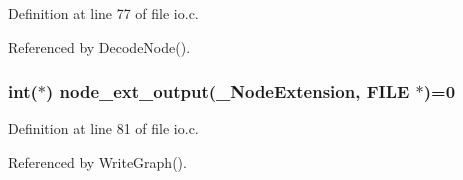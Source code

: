 Definition at line 77 of file io.c.

Referenced by Decode\-Node().
\subsubsection{\setlength{\rightskip}{0pt plus 5cm}int($\ast$) \bf{node\_\-ext\_\-output}(\bf{\_\-Node\-Extension}, FILE $\ast$)=0}\label{io_8c_33ec8f1a5bc2744549a1bfc005cd7d26}




Definition at line 81 of file io.c.

Referenced by Write\-Graph().